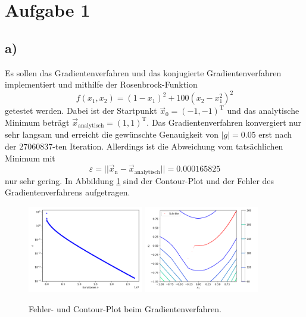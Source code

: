 \section*{Aufgabe 1}

\subsection*{a)}

Es sollen das Gradientenverfahren und das konjugierte Gradientenverfahren implementiert und mithilfe der Rosenbrock-Funktion
\begin{equation*}
  f(x_1, x_2) = (1-x_1)^2+100(x_2-x_1^2)^2
\end{equation*}
getestet werden.
Dabei ist der Startpunkt \(\vec{x}_0 = (-1, -1)^{\text{T}}\) und das analytische Minimum beträgt \(\vec{x}_\text{analytisch} = (1,1)^{\text{T}}\).
Das Gradientenverfahren konvergiert nur sehr langsam und erreicht die gewünschte Genauigkeit von \(|g| = \num{0,05}\) erst nach der \(\num{27060837}\)-ten Iteration.
Allerdings ist die Abweichung vom tatsächlichen Minimum mit
\begin{equation*}
  \varepsilon = ||\vec{x}_\text{n} - \vec{x}_\text{analytisch}|| = \num{0,000165825}
\end{equation*}
nur sehr gering.
In Abbildung \ref{fig:grad} sind der Contour-Plot und der Fehler des Gradientenverfahrens aufgetragen.
\begin{figure}
  \includegraphics[width=0.45\textwidth]{A1/build/gradientenverfahren.pdf}
  \includegraphics[width=0.45\textwidth]{A1/build/gradientenverfahren_contour.pdf}
  \caption{Fehler- und Contour-Plot beim Gradientenverfahren.}
  \label{fig:grad}
\end{figure}
